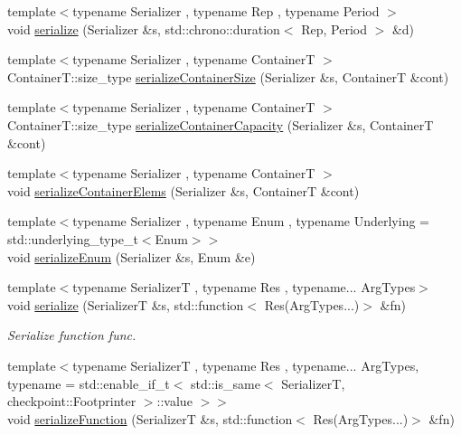 \begin{DoxyCompactItemize}
{\footnotesize template$<$typename Serializer , typename Rep , typename Period $>$ }\\void \hyperlink{namespacecheckpoint_aec244476371c452d9d9318b9d5b24401}{serialize} (Serializer \&s, std\+::chrono\+::duration$<$ Rep, Period $>$ \&d)
\item 
{\footnotesize template$<$typename Serializer , typename ContainerT $>$ }\\Container\+T\+::size\+\_\+type \hyperlink{namespacecheckpoint_a3359595d5a4c6fcf5fc95069c71f869b}{serialize\+Container\+Size} (Serializer \&s, ContainerT \&cont)
\item 
{\footnotesize template$<$typename Serializer , typename ContainerT $>$ }\\Container\+T\+::size\+\_\+type \hyperlink{namespacecheckpoint_abb25020fd55429c701342e79205a8d9a}{serialize\+Container\+Capacity} (Serializer \&s, ContainerT \&cont)
\item 
{\footnotesize template$<$typename Serializer , typename ContainerT $>$ }\\void \hyperlink{namespacecheckpoint_a9c880ba9bb9a106e784e06554b2fbcf2}{serialize\+Container\+Elems} (Serializer \&s, ContainerT \&cont)
\item 
{\footnotesize template$<$typename Serializer , typename Enum , typename Underlying  = std\+::underlying\+\_\+type\+\_\+t$<$\+Enum$>$$>$ }\\void \hyperlink{namespacecheckpoint_a5f368cb543eec78bb608a68fe2401562}{serialize\+Enum} (Serializer \&s, Enum \&e)
\item 
{\footnotesize template$<$typename SerializerT , typename Res , typename... Arg\+Types$>$ }\\void \hyperlink{namespacecheckpoint_ad3043fe034b7bf1d0d864e1e819c84d4}{serialize} (SerializerT \&s, std\+::function$<$ Res(Arg\+Types...)$>$ \&fn)
\begin{DoxyCompactList}\small\item\em Serialize function {\ttfamily func}. \end{DoxyCompactList}\item 
{\footnotesize template$<$typename SerializerT , typename Res , typename... Arg\+Types, typename  = std\+::enable\+\_\+if\+\_\+t$<$    std\+::is\+\_\+same$<$      Serializer\+T,      checkpoint\+::\+Footprinter    $>$\+::value  $>$$>$ }\\void \hyperlink{namespacecheckpoint_a4161978e6d6de385d942cbcbe659817a}{serialize\+Function} (SerializerT \&s, std\+::function$<$ Res(Arg\+Types...)$>$ \&fn)
\item 

\end{DoxyCompactItemize}
